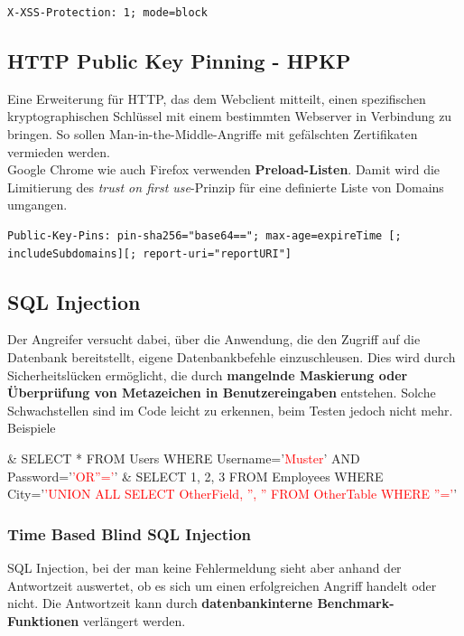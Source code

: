 \begin{lstlisting}[language={},caption=Beispiel des X-XSS-Protection Headers]
X-XSS-Protection: 1; mode=block
\end{lstlisting}

\subsection{HTTP Public Key Pinning - HPKP}
Eine Erweiterung für HTTP, das dem Webclient mitteilt, einen spezifischen kryptographischen Schlüssel mit einem bestimmten Webserver in Verbindung zu bringen. So sollen Man-in-the-Middle-Angriffe mit gefälschten Zertifikaten vermieden werden.\\

Google Chrome wie auch Firefox verwenden \textbf{Preload-Listen}. Damit wird die Limitierung des \textit{trust on first use}-Prinzip für eine definierte Liste von Domains umgangen.

\begin{lstlisting}[language={},caption=Beispiel des HPKP-Headers]
Public-Key-Pins: pin-sha256="base64=="; max-age=expireTime [; includeSubdomains][; report-uri="reportURI"]
\end{lstlisting}

\subsection{SQL Injection}
Der Angreifer versucht dabei, über die Anwendung, die den Zugriff auf die Datenbank bereitstellt, eigene Datenbankbefehle einzuschleusen. Dies wird durch Sicherheitslücken ermöglicht, die durch \textbf{mangelnde Maskierung oder Überprüfung von Metazeichen in Benutzereingaben} entstehen. Solche Schwachstellen sind im Code leicht zu erkennen, beim Testen jedoch nicht mehr.
Beispiele
\begin{easylist}[itemize]
	& SELECT * FROM Users WHERE Username='\textcolor{red}{Muster}' AND Password='\textcolor{red}{'OR''='}'
	& SELECT 1, 2, 3 FROM Employees WHERE City='\textcolor{red}{'UNION ALL SELECT OtherField, '', '' FROM OtherTable WHERE ''='}'
\end{easylist}

\subsubsection{Time Based Blind SQL Injection}
SQL Injection, bei der man keine Fehlermeldung sieht aber anhand der Antwortzeit auswertet, ob es sich um einen erfolgreichen Angriff handelt oder nicht. Die Antwortzeit kann durch \textbf{datenbankinterne Benchmark-Funktionen} verlängert werden.

